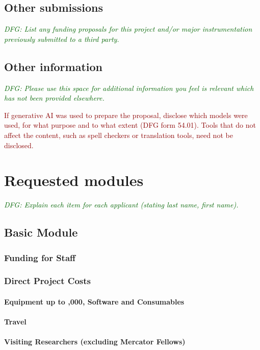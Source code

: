\documentclass[a4paper,11pt]{amsart}
\newcommand{\euro}{\texteuro}
\theoremstyle{definition}
\newcommand{\<}{\langle}
\renewcommand{\>}{\rangle}
\newcommand{\dfg}[1]{\emph{\textcolor{darkgreen}{DFG: #1}}}
\newcommand{\tk}[1]{\textcolor{darkred}{#1}}
\begin{document}
\subsection{Other submissions}
\dfg{List any funding proposals for this project and/or major
  instrumentation previously submitted to a third party.}

\subsection{Other information}
\dfg{Please use this space for additional information you feel
  is relevant which has not been provided elsewhere.}

\tk{If generative AI was used to prepare the proposal, disclose which
  models were used, for what purpose and to what extent (DFG form
  54.01).  Tools that do not affect the content, such as spell
  checkers or translation tools, need not be disclosed.}

\section{Requested modules}
\dfg{Explain each item for each applicant (stating last name, first
  name).}

\subsection{Basic Module}

\subsubsection{Funding for Staff}

\lipsum[9]

\subsubsection{Direct Project Costs}

\paragraph{Equipment up to \euro 10,000, Software and Consumables}

\paragraph{Travel}

\paragraph{Visiting Researchers (excluding Mercator Fellows)}
\end{document}
